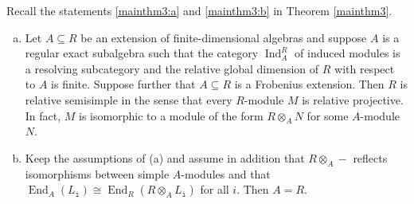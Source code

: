 \documentclass[12pt,a4paper]{amsart}
\theoremstyle{plain}
\theoremstyle{definition}
\numberwithin{equation}{thm}
\DeclareMathOperator{\End}{End}
\DeclareMathOperator{\Ind}{Ind}
\begin{document}
Recall the statements \eqref{mainthm3:a} and \eqref{mainthm3:b} in Theorem \ref{mainthm3}.

{\it \begin{enumerate}[(a)]
\item Let $A\subseteq R$ be an extension of finite-dimensional algebras and
  suppose $A$ is a regular exact subalgebra such that the category  $\Ind_A^R$ of induced modules is a
  resolving subcategory and the relative global dimension of $R$ with respect to $A$ is finite. Suppose further
  that $A\subseteq R$ is a Frobenius extension. 
  Then $R$ is relative semisimple in the sense that every $R$-module $M$ is
  relative projective. In fact, $M$ is isomorphic to a module of the form
  $R\otimes_A N$ for some $A$-module $N$. 
\item Keep the assumptions of (a) and assume in addition that $R\otimes_A -$ 
  reflects isomorphisms between simple $A$-modules and that 
  $\End_A(L_\mathtt{i})\cong\End_R(R\otimes_A L_\mathtt{i})$ for all $i$. Then
  $A=R$. 
\end{enumerate}
}
\end{document}
